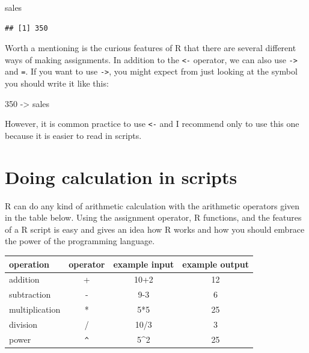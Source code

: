 \documentclass[
  12pt,
  oneside]{book}
\newenvironment{Shaded}{\begin{snugshade}}{\end{snugshade}}
\newcommand{\DecValTok}[1]{\textcolor[rgb]{0.00,0.00,0.81}{#1}}
\newcommand{\NormalTok}[1]{#1}
\newcommand{\OtherTok}[1]{\textcolor[rgb]{0.56,0.35,0.01}{#1}}
\theoremstyle{definition}
\theoremstyle{definition}
\theoremstyle{definition}
\theoremstyle{definition}
\theoremstyle{remark}
\begin{document}
\begin{Shaded}
\begin{Highlighting}[]
\NormalTok{sales}
\end{Highlighting}
\end{Shaded}

\begin{verbatim}
## [1] 350
\end{verbatim}

Worth a mentioning is the curious features of R that there are several different ways of making assignments. In addition to the \texttt{\textless{}-} operator, we can also use \texttt{-\textgreater{}} and \texttt{=}. If you want to use \texttt{-\textgreater{}}, you might expect from just looking at the symbol you should write it like this:

\begin{Shaded}
\begin{Highlighting}[]
\DecValTok{350} \OtherTok{{-}\textgreater{}}\NormalTok{ sales}
\end{Highlighting}
\end{Shaded}

However, it is common practice to use \texttt{\textless{}-} and I recommend only to use this one because it is easier to read in scripts.

\hypertarget{doing-calculation-in-scripts}{%
\section{Doing calculation in scripts}\label{doing-calculation-in-scripts}}

R can do any kind of arithmetic calculation with the arithmetic operators given in the table below. Using the assignment operator, R functions, and the features of a R script is easy and gives an idea how R works and how you should embrace the power of the programming language.

\begin{longtable}[]{@{}lccc@{}}
\toprule()
operation & operator & example input & example output \\
\midrule()
\endhead
addition & + & 10+2 & 12 \\
subtraction & - & 9-3 & 6 \\
multiplication & * & 5*5 & 25 \\
division & / & 10/3 & 3 \\
power & \texttt{\^{}} & 5\^{}2 & 25 \\
\bottomrule()
\end{longtable}
\end{document}
